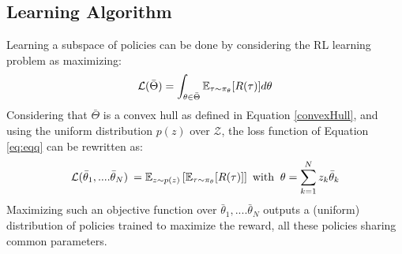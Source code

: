 \subsection{Learning Algorithm}
\label{subsec:learningsubspaces}
\vspace{-0.3cm}
Learning a subspace of policies can be done by considering the RL learning problem as maximizing:
\begin{equation}
    \mathcal{L}(\bar{\Theta}) = \int_{\theta \in \bar{\Theta}} \mathbb{E}_{\tau \sim \pi_\theta}[R(\tau)] d\theta  \vspace{-0.1cm} 
    \label{eq:eqq}
\end{equation}
Considering that $\bar{\Theta}$ is a convex hull as defined in Equation \ref{convexHull}, and using the uniform distribution $p(z)$ over $\mathcal{Z}$, the loss function of Equation \ref{eq:eqq} can be rewritten as:
\begin{equation}
    \mathcal{L}(\bar{\theta}_1,....\bar{\theta}_N) \:=  \mathbb{E}_{z \sim p(z)} \left[ \mathbb{E}_{\tau \sim \pi_{\theta}}[R(\tau)] \right] \text{ with } \:\theta=\sum\limits_{k=1}^N z_k \bar{\theta}_k  \vspace{-0.1cm} 
\end{equation}
Maximizing such an objective function over $\bar{\theta}_1,....\bar{\theta}_N$ outputs a (uniform) distribution of policies trained to maximize the reward, all these policies sharing common parameters. 

